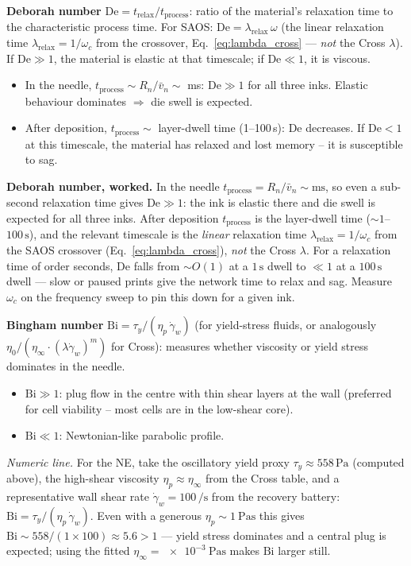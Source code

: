 \documentclass[11pt,a4paper]{article}
\newcommand{\gd}{\dot{\gamma}}
\newcommand{\Bi}{\mathrm{Bi}}
\newcommand{\De}{\mathrm{De}}
\begin{document}
\begin{dimensionlessbox}
\textbf{Deborah number} $\De = t_\mathrm{relax}/t_\mathrm{process}$:
ratio of the material's relaxation time to the characteristic process
time. For SAOS: $\De = \lambda_\mathrm{relax}\,\omega$ (the linear relaxation time $\lambda_\mathrm{relax}=1/\omega_c$ from the crossover, Eq.~\ref{eq:lambda_cross} --- \emph{not} the Cross $\lambda$). If $\De\gg 1$, the material
is elastic at that timescale; if $\De\ll 1$, it is viscous.

\begin{itemize}[leftmargin=1.4em,itemsep=2pt]
\item In the needle, $t_\mathrm{process}\sim R_n/\bar v_n\sim$ ms:
  $\De\gg 1$ for all three inks. Elastic behaviour dominates $\Rightarrow$
  die swell is expected.
\item After deposition, $t_\mathrm{process}\sim$ layer-dwell time
  (1--100\,\si{\s}): $\De$ decreases. If $\De<1$ at this timescale,
  the material has relaxed and lost memory -- it is susceptible to sag.
\end{itemize}
\textbf{Deborah number, worked.} In the needle $t_\mathrm{process}=R_n/\bar v_n
\sim\si{\ms}$, so even a sub-second relaxation time gives $\De\gg1$: the ink
is elastic there and die swell is expected for all three inks. After
deposition $t_\mathrm{process}$ is the layer-dwell time
($\sim1$--$100\,\si{\s}$), and the relevant timescale is the \emph{linear}
relaxation time $\lambda_\mathrm{relax}=1/\omega_c$ from the SAOS crossover
(Eq.~\ref{eq:lambda_cross}), \emph{not} the Cross $\lambda$. For a
relaxation time of order seconds, $\De$ falls from $\sim O(1)$ at a
$1\,\si{\s}$ dwell to $\ll1$ at a $100\,\si{\s}$ dwell --- slow or paused
prints give the network time to relax and sag. Measure $\omega_c$ on the
frequency sweep to pin this down for a given ink.

\textbf{Bingham number} $\Bi = \tau_y / (\eta_p\,\gd_w)$ (for yield-stress
fluids, or analogously $\eta_0/(\eta_\infty\cdot(\lambda\gd_w)^m)$ for
Cross): measures whether viscosity or yield stress dominates in the
needle.
\begin{itemize}[leftmargin=1.4em,itemsep=1pt]
\item $\Bi\gg 1$: plug flow in the centre with thin shear layers at the
  wall (preferred for cell viability -- most cells are in the low-shear
  core).
\item $\Bi\ll 1$: Newtonian-like parabolic profile.
\end{itemize}
\emph{Numeric line.} For the NE, take the oscillatory yield proxy
$\tau_y\approx 558\,\si{\Pa}$ (computed above), the high-shear viscosity
$\eta_p\approx\eta_\infty$ from the Cross table, and a representative wall
shear rate $\gd_w=100\,\si{\per\s}$ from the recovery battery:
$\Bi=\tau_y/(\eta_p\,\gd_w)$. Even with a generous $\eta_p\sim \SI{1}{\Pa\s}$
this gives $\Bi\sim 558/(1\times 100)\approx 5.6>1$ --- yield stress
dominates and a central plug is expected; using the fitted
$\eta_\infty=\SI{e-3}{\Pa\s}$ makes $\Bi$ larger still.


\end{dimensionlessbox}
\end{document}
